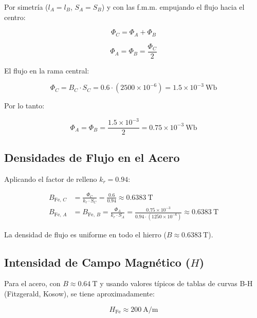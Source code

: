 \documentclass[12pt,a4paper]{article}
\begin{document}
Por simetría ($l_A = l_B$, $S_A = S_B$) y con las f.m.m. empujando el flujo hacia el centro:

\begin{equation}
    \Phi_C = \Phi_A + \Phi_B
\end{equation}

\begin{equation}
    \Phi_A = \Phi_B = \frac{\Phi_C}{2}
\end{equation}

El flujo en la rama central:

\begin{equation}
    \Phi_C = B_C \cdot S_C = 0.6 \cdot (2500 \times 10^{-6}) = 1.5 \times 10^{-3}\ \si{\weber}
\end{equation}

Por lo tanto:

\begin{equation}
    \Phi_A = \Phi_B = \frac{1.5 \times 10^{-3}}{2} = 0.75 \times 10^{-3}\ \si{\weber}
\end{equation}

\subsection{Densidades de Flujo en el Acero}

Aplicando el factor de relleno $k_r = 0.94$:

\begin{align}
    B_{\text{Fe},\,C} &= \frac{\Phi_C}{k_r \cdot S_C}
    = \frac{0.6}{0.94} \approx \SI{0.6383}{\tesla} \\
    B_{\text{Fe},\,A} &= B_{\text{Fe},\,B}
    = \frac{\Phi_A}{k_r \cdot S_A}
    = \frac{0.75 \times 10^{-3}}{0.94 \cdot (1250 \times 10^{-6})}
    \approx \SI{0.6383}{\tesla}
\end{align}

La densidad de flujo es uniforme en todo el hierro ($B \approx \SI{0.6383}{\tesla}$).

\subsection{Intensidad de Campo Magnético ($H$)}

Para el acero, con $B \approx \SI{0.64}{\tesla}$ y usando valores típicos de tablas de curvas B-H (Fitzgerald, Kosow), se tiene aproximadamente:

\begin{equation}
    H_{\text{Fe}} \approx \SI{200}{\ampere\per\meter}
\end{equation}
\end{document}
